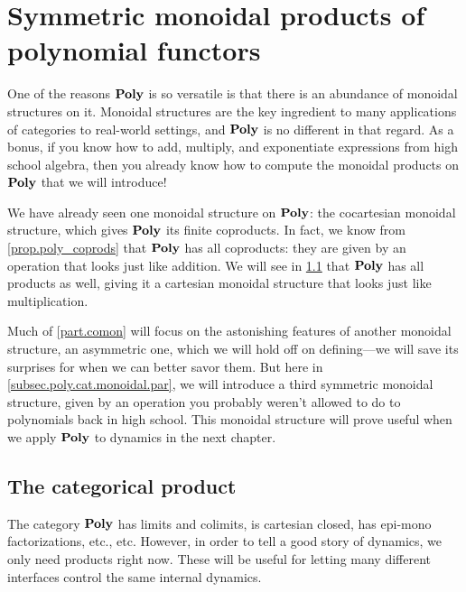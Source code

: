\documentclass[Book-Poly]{subfiles}
\begin{document}
\section{Symmetric monoidal products of polynomial functors} \label{sec.poly.cat.monoidal}

One of the reasons $\mathbf{Poly}$ is so versatile is that there is an abundance of monoidal structures on it.
Monoidal structures are the key ingredient to many applications of categories to real-world settings, and $\mathbf{Poly}$ is no different in that regard.
As a bonus, if you know how to add, multiply, and exponentiate expressions from high school algebra, then you already know how to compute the monoidal products on $\mathbf{Poly}$ that we will introduce!

We have already seen one monoidal structure on $\mathbf{Poly}$: the cocartesian monoidal structure, which gives $\mathbf{Poly}$ its finite coproducts.
In fact, we know from \cref{prop.poly_coprods} that $\mathbf{Poly}$ has all coproducts: they are given by an operation that looks just like addition.
We will see in \cref{subsec.poly.cat.monoidal.prod} that $\mathbf{Poly}$ has all products as well, giving it a cartesian monoidal structure that looks just like multiplication.

Much of \cref{part.comon} will focus on the astonishing features of another monoidal structure, an asymmetric one, which we will hold off on defining---we will save its surprises for when we can better savor them.
But here in \cref{subsec.poly.cat.monoidal.par}, we will introduce a third symmetric monoidal structure, given by an operation you probably weren't allowed to do to polynomials back in high school.
This monoidal structure will prove useful when we apply $\mathbf{Poly}$ to dynamics in the next chapter.

\subsection{The categorical product} \label{subsec.poly.cat.monoidal.prod}
The category $\mathbf{Poly}$ has limits and colimits, is cartesian closed, has epi-mono factorizations, etc., etc. However, in order to tell a good story of dynamics, we only need products right now. These will be useful for letting many different interfaces control the same internal dynamics.
\end{document}
